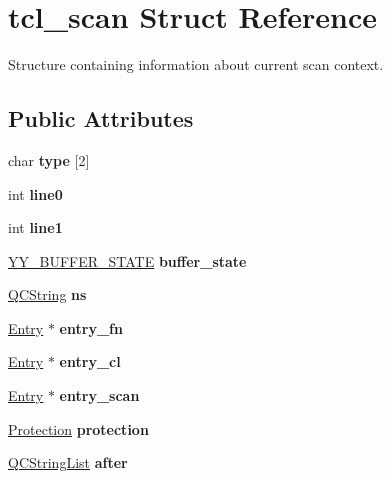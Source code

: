\hypertarget{structtcl__scan}{}\section{tcl\+\_\+scan Struct Reference}
\label{structtcl__scan}


Structure containing information about current scan context.  


\subsection*{Public Attributes}
\begin{DoxyCompactItemize}
\item 
\mbox{\label{structtcl__scan_a1e8465613aa17a4634c16633a479ced1}} 
char {\bfseries type} \mbox{[}2\mbox{]}
\item 
\mbox{\label{structtcl__scan_a858b5f4a6e03f1db3e88b8413218ab04}} 
int {\bfseries line0}
\item 
\mbox{\label{structtcl__scan_aaec63dc6756ade838f966b120cf10eb8}} 
int {\bfseries line1}
\item 
\mbox{\label{structtcl__scan_aaf056096a727f78a1be5b9a5dcf2a148}} 
\mbox{\hyperlink{structyy__buffer__state}{Y\+Y\+\_\+\+B\+U\+F\+F\+E\+R\+\_\+\+S\+T\+A\+TE}} {\bfseries buffer\+\_\+state}
\item 
\mbox{\label{structtcl__scan_a1f532136748d05b901b68d1ca71ae66b}} 
\mbox{\hyperlink{class_q_c_string}{Q\+C\+String}} {\bfseries ns}
\item 
\mbox{\label{structtcl__scan_a398ca9e031679162c67ce3975639eff9}} 
\mbox{\hyperlink{class_entry}{Entry}} $\ast$ {\bfseries entry\+\_\+fn}
\item 
\mbox{\label{structtcl__scan_aeb6315712af342cc7021ee06a6f99908}} 
\mbox{\hyperlink{class_entry}{Entry}} $\ast$ {\bfseries entry\+\_\+cl}
\item 
\mbox{\label{structtcl__scan_ad98a63982cc5ec19c916304f7056c52f}} 
\mbox{\hyperlink{class_entry}{Entry}} $\ast$ {\bfseries entry\+\_\+scan}
\item 
\mbox{\label{structtcl__scan_aef45ec997f24054aa18863a2da0feffd}} 
\mbox{\hyperlink{types_8h_a90e352184df58cd09455fe9996cd4ded}{Protection}} {\bfseries protection}
\item 
\mbox{\label{structtcl__scan_a2ac81759c8df9958a1382f023371a209}} 
\mbox{\hyperlink{class_q_c_string_list}{Q\+C\+String\+List}} {\bfseries after}
\end{DoxyCompactItemize}


